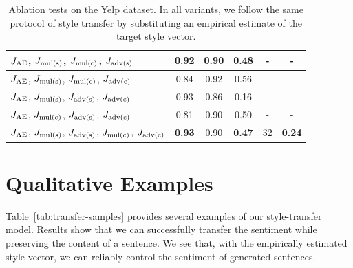 \documentclass[letterpaper]{article}
\begin{document}
\begin{table}[ht]
\begin{tabular}{| l || c | c | c | c || c |}
		$J_{\text{AE}}$, $J_{\text{mul(s)}}$, $J_{\text{mul(c)}}$, $J_{\text{adv(s)}}$                  & 0.92          & 0.90          & 0.48          & -            & -             \\ \hline
		$J_{\text{AE}}$, $J_{\text{mul(s)}}$, $J_{\text{mul(c)}}$, $J_{\text{adv(c)}}$                  & 0.84          & 0.92          & 0.56          & -            & -             \\ \hline
		$J_{\text{AE}}$, $J_{\text{mul(s)}}$, $J_{\text{adv(s)}}$, $J_{\text{adv(c)}}$                  & 0.93          & 0.86          & 0.16          & -            & -             \\ \hline
		$J_{\text{AE}}$, $J_{\text{mul(c)}}$, $J_{\text{adv(s)}}$, $J_{\text{adv(c)}}$                  & 0.81          & 0.90          & 0.50          & -            & -             \\ \hline
		$J_{\text{AE}}$, $J_{\text{mul(s)}}$, $J_{\text{adv(s)}}$, $J_{\text{mul(c)}}$, $J_{\text{adv(c)}}$ & \textbf{0.93} & 0.90          & \textbf{0.47} & 32           & \textbf{0.24} \\ \hline
	\end{tabular}\vspace{-.2cm}
	\caption{Ablation tests on the Yelp dataset. In all variants, we follow the same protocol of style transfer by substituting an empirical estimate of the target style vector.}
	\label{tab:ablation-results}
\end{table}

\section{Qualitative Examples}

Table~\ref{tab:transfer-samples} provides several examples of our style-transfer model.
Results show that we can successfully transfer the sentiment while preserving the content of a sentence.
We see that, with the empirically estimated style vector, we can reliably control the sentiment of generated sentences.
\end{document}
